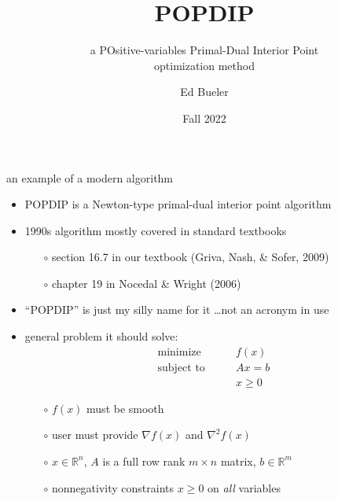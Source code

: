 \documentclass[10pt,hyperref,dvipsnames]{beamer}
\title{POPDIP}
\subtitle{a POsitive-variables Primal-Dual Interior Point \\ optimization method}
\author{Ed Bueler}
\institute[MATH 661]{MATH 661 Optimization}
\date{Fall 2022}
\newcommand{\grad}{\nabla}
\newcommand{\RR}{\mathbb{R}}
\begin{document}
\beamertemplatenavigationsymbolsempty

\begin{frame}
  \maketitle
\end{frame}


\begin{frame}{an example of a modern algorithm}

\begin{itemize}
\item POPDIP is a Newton-type primal-dual interior point algorithm
\item 1990s algorithm mostly covered in standard textbooks
    \begin{itemize}
    \item[$\circ$] section 16.7 in our textbook (Griva, Nash, \& Sofer, 2009)
    \item[$\circ$] chapter 19 in Nocedal \& Wright (2006)
    \end{itemize}
\item ``POPDIP'' is just my silly name for it \dots not an acronym in use

\bigskip
\item general problem it should solve:
\begin{equation*}
\begin{matrix}
\text{minimize} \qquad   & f(x) \\
\text{subject to} \qquad & A x = b \\
                         & x \ge 0
\end{matrix}
\end{equation*}

    \begin{itemize}
    \item[$\circ$] $f(x)$ must be smooth
    \item[$\circ$] user must provide $\grad f(x)$ and $\grad^2 f(x)$
    \item[$\circ$] $x\in \RR^n$, $A$ is a full row rank $m\times n$ matrix, $b\in\RR^m$
    \item[$\circ$] nonnegativity constraints $x\ge 0$ on \emph{all} variables
    \end{itemize}
\end{itemize}
\end{frame}
\end{document}
